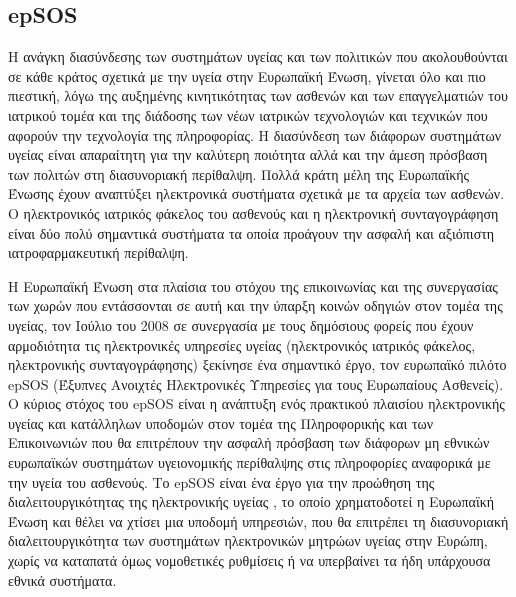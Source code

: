 	
	
	\subsection{epSOS}
	
		Η ανάγκη διασύνδεσης των συστημάτων υγείας και των πολιτικών που ακολουθούνται σε κάθε κράτος σχετικά με την υγεία στην Ευρωπαϊκή Ένωση, γίνεται όλο και πιο πιεστική, λόγω της αυξημένης κινητικότητας των ασθενών και των επαγγελματιών του ιατρικού τομέα και της διάδοσης των νέων ιατρικών τεχνολογιών και τεχνικών που αφορούν την τεχνολογία της πληροφορίας. Η διασύνδεση των διάφορων συστημάτων υγείας είναι απαραίτητη για την καλύτερη ποιότητα αλλά και την άμεση πρόσβαση των πολιτών στη διασυνοριακή περίθαλψη.  Πολλά κράτη μέλη της Ευρωπαϊκής Ένωσης έχουν αναπτύξει ηλεκτρονικά συστήματα σχετικά με τα αρχεία των ασθενών. Ο ηλεκτρονικός ιατρικός φάκελος του ασθενούς και η ηλεκτρονική συνταγογράφηση είναι δύο πολύ σημαντικά συστήματα τα οποία προάγουν την ασφαλή και αξιόπιστη ιατροφαρμακευτική περίθαλψη.	 	
	 	
	 	Η Ευρωπαϊκή Ένωση στα πλαίσια του στόχου της επικοινωνίας και της συνεργασίας των χωρών που εντάσσονται σε αυτή και την ύπαρξη κοινών οδηγιών στον τομέα της υγείας, τον Ιούλιο του 2008 σε συνεργασία με τους δημόσιους φορείς που έχουν αρμοδιότητα τις ηλεκτρονικές υπηρεσίες υγείας (ηλεκτρονικός ιατρικός φάκελος, ηλεκτρονικής συνταγογράφησης) ξεκίνησε ένα σημαντικό έργο, τον ευρωπαϊκό πιλότο epSOS (Έξυπνες Ανοιχτές Ηλεκτρονικές Υπηρεσίες για τους Ευρωπαίους Ασθενείς). Ο κύριος στόχος του epSOS είναι η ανάπτυξη ενός πρακτικού πλαισίου ηλεκτρονικής υγείας και κατάλληλων  υποδομών  στον τομέα της  Πληροφορικής και των Επικοινωνιών που θα επιτρέπουν την ασφαλή πρόσβαση των διάφορων μη εθνικών ευρωπαϊκών συστημάτων υγειονομικής περίθαλψης στις πληροφορίες αναφορικά με την υγεία του ασθενούς. Το epSOS είναι ένα έργο για την προώθηση της διαλειτουργικότητας της ηλεκτρονικής υγείας , το οποίο χρηματοδοτεί η Ευρωπαϊκή Ένωση και θέλει να χτίσει μια υποδομή υπηρεσιών, που θα επιτρέπει  τη διασυνοριακή διαλειτουργικότητα των συστημάτων ηλεκτρονικών μητρώων υγείας στην Ευρώπη, χωρίς να καταπατά όμως νομοθετικές ρυθμίσεις ή να υπερβαίνει τα ήδη υπάρχουσα εθνικά συστήματα. \cite{Dogac2012}


